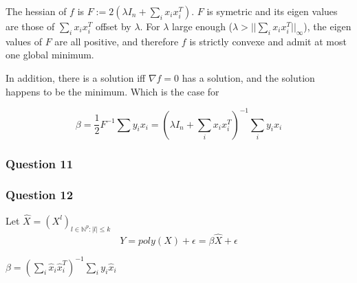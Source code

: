 \documentclass[12pt]{article}
\newcommand{\Q}[1]{\subsubsection*{Question #1}}
\begin{document}
\begin{itemize}
The hessian of $f$ is $F := 2(\lambda I_n + \sum_i x_i x_i^T)$. $F$ is symetric and its eigen values are those of $\sum_i x_i x_i^T$ offset by $\lambda$. For $\lambda$ large enough ($\lambda > ||\sum_i x_i x_i^T||_{\infty}$), the eigen values of $F$ are all positive, and therefore $f$ is strictly convexe and admit at most one global minimum.

In addition, there is a solution iff $\nabla f = 0$ has a solution, and the solution happens to be the minimum. Which is the case for 

$$\beta = \frac12 F^{-1} \sum y_i x_i = (\lambda I_n + \sum_i x_i x_i^T)^{-1} \sum_i y_i x_i$$


\Q{11}

\Q{12}

Let $\hat X = (X^l)_{l \in \mathbb{N}^p: |l| \leq k}$
$$Y = poly(X) + \epsilon = \beta \hat X + \epsilon$$

$\beta = (\sum_i \hat x_i \hat x_i^T)^{-1} \sum_i y_i \hat x_i$

\end{itemize}
\end{document}
